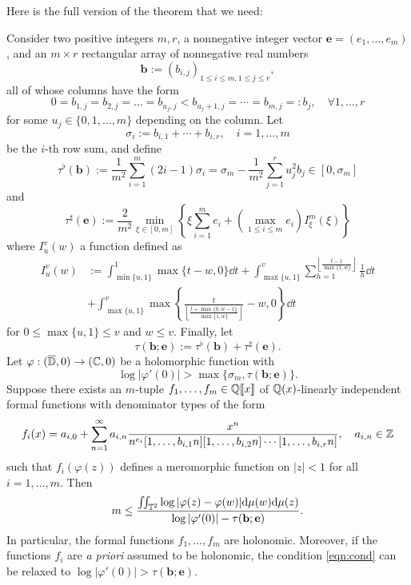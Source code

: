 Here is the full version of the theorem that we need:
\begin{theorem}
\label{thm:bound}
Consider two positive integers $m, r$, a nonnegative integer vector $\mathbf{e} = (e_1, \dots, e_m)$, and an $m \times r$ rectangular array of nonnegative real numbers
$$
    \mathbf{b} := (b_{i,j})_{1 \le i \le m, 1 \le j \le r},
$$
all of whose columns have the form
$$
0 = b_{1, j} = b_{2, j} = \dots = b_{u_j, j} < b_{u_j + 1, j} = \cdots = b_{m, j} =: b_j, \quad \forall 1, \dots, r
$$
for some $u_j \in \{0, 1, \dots, m\}$ depending on the column.
Let
$$
    \sigma_i := b_{i, 1} + \cdots + b_{i, r}, \quad i = 1, \dots, m
$$
be the $i$-th row sum, and define
$$
    \tau^{\flat}(\mathbf{b}) := \frac{1}{m^2} \sum_{i=1}^{m}(2i - 1)\sigma_i = \sigma_m - \frac{1}{m^2} \sum_{j=1}^{r} u_j^2 b_j \in [0, \sigma_m]
$$
and
$$
    \tau^{\sharp}(\mathbf{e}) := \frac{2}{m^2} \min_{\xi \in [0, m]} \left\{ \xi \sum_{i=1}^{m} e_i + \left(\max_{1 \le i \le m} e_i\right) I_\xi^{m}(\xi)\right\}
$$
where $I_{u}^{v}(w)$ a function defined as
\begin{align*}
    I_{u}^{v}(w) &:= \int_{\min\{u, 1\}}^{1} \max\{t - w, 0\} \dd t + \int_{\max\{u, 1\}}^{v} \sum_{h=1}^{\left\lfloor \frac{t - 1}{ \max \{1, w\}} \right\rfloor} \frac{1}{h} \dd t \\
    &+ \int_{\max\{u, 1\}}^{v} \max\left\{ \frac{t}{\left\lfloor \frac{t + \max\{0, w-1\}}{\max\{1, w\}} \right\rfloor} - w, 0\right\} \dd t
\end{align*}
for $0 \le \max\{u, 1\} \le v$ and $w \le v$.
Finally, let
$$
\tau(\mathbf{b}; \mathbf{e}) := \tau^{\flat}(\mathbf{b}) + \tau^{\sharp}(\mathbf{e}).
$$
Let $\varphi: (\overline{\mathbb{D}}, 0) \to (\mathbb{C}, 0)$ be a holomorphic function with
\begin{equation}
\label{eqn:cond}
    \log |\varphi'(0)| > \max\{\sigma_m, \tau(\mathbf{b}; \mathbf{e})\}.
\end{equation}
Suppose there exists an $m$-tuple $f_1, \dots, f_m \in \mathbb{Q}\llbracket x\rrbracket$ of $\mathbb{Q}(x)$-linearly independent formal functions with denominator types of the form
$$
    f_i(x) = a_{i, 0} + \sum_{n=1}^{\infty} a_{i, n} \frac{x^n}{n^{e_i} [1, \dots, b_{i, 1}n][1, \dots, b_{i, 2}n] \cdots[1, \dots, b_{i, r}n]}, \quad a_{i, n} \in \mathbb{Z}
$$
such that $f_i(\varphi(z))$ defines a meromorphic function on $|z| < 1$ for all $i = 1, \dots, m$.
Then
\begin{equation}
\label{eqn:holonomybound}
    m \le \frac{\iint_{\mathbb{T}^2} \log |\varphi(z) - \varphi(w)| \mathrm{d} \mu(w) \mathrm{d} \mu(z)}{\log |\varphi'(0)| - \tau(\mathbf{b};\mathbf{e})}.
\end{equation}
In particular, the formal functions $f_1, \dots, f_m$ are holonomic.
Moreover, if the functions $f_i$ are \emph{a priori} assumed to be holonomic, the condition \eqref{eqn:cond} can be relaxed to $\log |\varphi'(0)| > \tau(\mathbf{b}; \mathbf{e})$.
\end{theorem}

